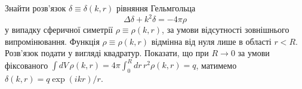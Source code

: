 \begin{problem}%
Знайти розв’язок \( \delta \equiv \delta(k, r) \) рівняння Гельмгольца
\begin{equation*}
   \Delta \delta + k^2 \delta = -4\pi\rho
\end{equation*}
у випадку сферичної симетрії \(
\rho \equiv \rho(k, r) \), за умови відсутності зовнішнього випромінювання. Функція \( \rho \equiv \rho(k, r) \) відмінна від нуля лише в області \( r <
R \). Розв’язок подати у вигляді квадратур. Показати, що при \( R \to 0 \) за умови фіксованого \( \int dV \, \rho(k, r) = 4\pi \int_0^R dr \, r^2
\rho(k, r) = q \), матимемо \( \delta(k, r) = q \exp(ikr) / r \).
\end{problem}


